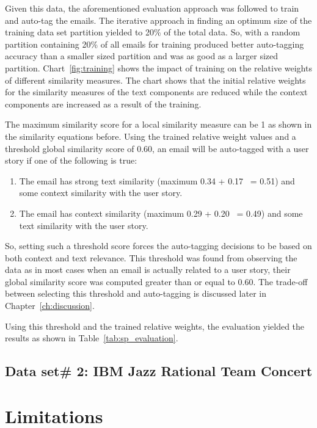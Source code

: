 Given this data, the aforementioned evaluation approach was followed to train and auto-tag the emails. The iterative approach in finding an optimum size of the training data set partition yielded to 20\% of the total data. So, with a random partition containing 20\% of all emails for training produced better auto-tagging accuracy than a smaller sized partition and was as good as a larger sized partition. Chart~\ref{fig:training} shows the impact of training on the relative weights of different similarity measures. The chart shows that the initial relative weights for the similarity measures of the text components are reduced while the context components are increased as a result of the training.

The maximum similarity score for a local similarity measure can be 1 as shown in the similarity equations before. Using the trained relative weight values and a threshold global similarity score of 0.60, an email will be auto-tagged with a user story if one of the following is true:
\begin{enumerate}
	\item The email has strong text similarity (maximum 0.34 + 0.17 ~= 0.51) and some context similarity with the user story.
	\item The email has context similarity (maximum 0.29 + 0.20 ~= 0.49) and some text similarity with the user story.
\end{enumerate}
So, setting such a threshold score forces the auto-tagging decisions to be based on both context and text relevance. This threshold was found from observing the data as in most cases when an email is actually related to a user story, their global similarity score was computed greater than or equal to 0.60. The trade-off between selecting this threshold and auto-tagging is discussed later in Chapter~\ref{ch:discussion}.

Using this threshold and the trained relative weights, the evaluation yielded the results as shown in Table~\ref{tab:sp_evaluation}.

\subsection{Data set\# 2: IBM Jazz Rational Team Concert}
\section{Limitations}
	
